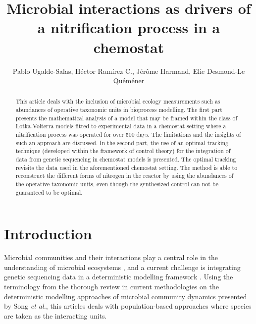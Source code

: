 \documentclass[3p,times]{article}
\begin{document}
\title{Microbial interactions as drivers of a nitrification process in a chemostat}

\author{Pablo Ugalde-Salas, Héctor Ramírez C., Jérôme Harmand, Elie Desmond-Le Quéméner}
\date{}
\maketitle



\begin{abstract}
	This article deals with the inclusion of microbial ecology measurements such as abundances of operative taxonomic units in bioprocess modelling. The first part presents the mathematical analysis of a model that may be framed within the class of Lotka-Volterra models fitted to experimental data in a chemostat setting where a nitrification process was operated for over 500 days. The limitations and the insights of such an approach are discussed. In the second part,  the use of an optimal tracking technique (developed within the framework of control theory) for the integration of data from genetic sequencing in chemostat models is presented. The optimal tracking revisits the data used in the aforementioned chemostat setting. The method is able to reconstruct the different forms of nitrogen in the reactor by using the abundances of the operative taxonomic units, even though the synthesized control can not be guaranteed to be optimal. 
\end{abstract}



\section{Introduction}


Microbial communities and their interactions play a central role in the understanding of microbial ecosystems \cite{West2007}, and a current challenge is integrating genetic sequencing data in a deterministic modelling framework \cite{Widder2016,WADE201664}. Using the terminology from the thorough review in current methodologies on the deterministic modelling approaches of microbial community dynamics presented by Song \textit{et al.}\cite{Song2014}, this articles deals with population-based approaches where species are taken as the interacting units.
\end{document}
